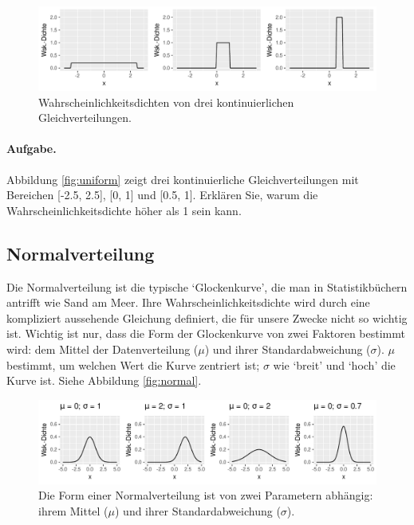 \documentclass[oneside, 10pt]{book}\usepackage[]{graphicx}\usepackage[]{xcolor}
\newenvironment{knitrout}{}{} %
\begin{document}
\begin{knitrout}
\color{fgcolor}\begin{figure}[tp]

{\centering \includegraphics[width=\textwidth]{figs/unnamed-chunk-114-1} 

}

\caption{Wahrscheinlichkeitsdichten von drei kontinuierlichen Gleichverteilungen.\label{fig:uniform}}\label{fig:unnamed-chunk-114}
\end{figure}

\end{knitrout}

\paragraph{Aufgabe.} Abbildung \ref{fig:uniform} zeigt
drei kontinuierliche Gleichverteilungen mit Bereichen [-2.5, 2.5], [0, 1] und [0.5, 1]. Erklären Sie,
warum die Wahrscheinlichkeitsdichte höher als 1 sein kann.

\subsection{Normalverteilung}
Die Normalverteilung ist die typische `Glockenkurve', die man in Statistikbüchern antrifft wie Sand am Meer.
Ihre Wahrscheinlichkeitsdichte wird durch eine kompliziert aussehende Gleichung definiert, die für unsere Zwecke nicht so wichtig ist. Wichtig ist nur, dass die Form der Glockenkurve von zwei Faktoren bestimmt wird: dem Mittel der Datenverteilung ($\mu$) und ihrer Standardabweichung ($\sigma$). $\mu$ bestimmt, um welchen Wert die Kurve zentriert ist; $\sigma$ wie `breit' und `hoch' die Kurve ist.
Siehe Abbildung \ref{fig:normal}.

\begin{knitrout}
\color{fgcolor}\begin{figure}[tp]

{\centering \includegraphics[width=\textwidth]{figs/unnamed-chunk-115-1} 

}

\caption{Die Form einer Normalverteilung ist von zwei Parametern abhängig: ihrem Mittel ($\mu$) und ihrer Standardabweichung ($\sigma$).\label{fig:normal}}\label{fig:unnamed-chunk-115}
\end{figure}

\end{knitrout}
\end{document}
